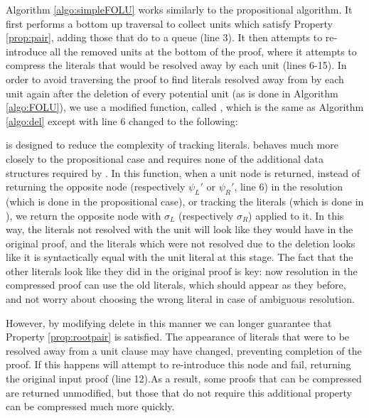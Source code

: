 Algorithm \ref{algo:simpleFOLU} works similarly to the propositional algorithm.  It first performs a bottom up traversal to collect units which satisfy Property \ref{prop:pair}, adding those that do to a queue (line 3). It then attempts to re-introduce all the removed units at the bottom of the proof, where it attempts to compress the literals that would be resolved away by each unit (lines 6-15). In order to avoid traversing the proof to find literals resolved away from by each unit again after the deletion of every potential unit (as is done in Algorithm \ref{algo:FOLU}), we use a modified  function, called , which is the same as Algorithm \ref{algo:del} except with line 6 changed to the following:


 is designed to reduce the complexity of tracking literals.  behaves much more closely to the propositional case and requires none of the additional data structures required by . In this function, when a unit node is returned, instead of returning the opposite node (respectively $\psi_L'$ or $\psi_R'$, line 6) in the resolution (which is done in the propositional case), or tracking the literals (which is done in ), we return the opposite node with $\sigma_L$ (respectively $\sigma_R$) applied to it. In this way, the literals not resolved with the unit will look like they would have in the original proof, and the literals which were not resolved due to the deletion looks like it is syntactically equal with the unit literal at this stage. The fact that the other literals look like they did in the original proof is key: now resolution in the compressed proof can use the old literals, which should appear as they before, and not worry about choosing the wrong literal in case of ambiguous resolution. 


However, by modifying delete in this manner we can longer guarantee that Property \ref{prop:rootpair} is satisfied. The appearance of literals that were to be resolved away from a unit clause may have changed, preventing completion of the proof. If this happens {\SFOLowerUnits} will attempt to re-introduce this node and fail, returning the original input proof (line 12).As a result, some proofs that can be compressed are returned unmodified, but those that do not require this additional property can be compressed much more quickly.


